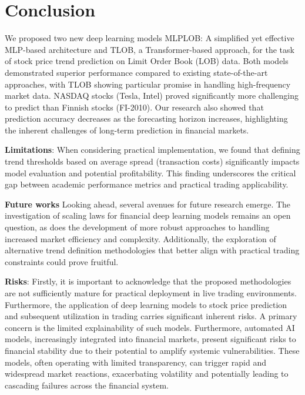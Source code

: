 \section{Conclusion}
We proposed two new deep learning models MLPLOB: A simplified yet effective MLP-based architecture and TLOB, a Transformer-based approach, for the task of stock price trend prediction on Limit Order Book (LOB) data. Both models demonstrated superior performance compared to existing state-of-the-art approaches, with TLOB showing particular promise in handling high-frequency market data. NASDAQ stocks (Tesla, Intel) proved significantly more challenging to predict than Finnish stocks (FI-2010). Our research also showed that prediction accuracy decreases as the forecasting horizon increases, highlighting the inherent challenges of long-term prediction in financial markets.
 
\textbf{Limitations}: When considering practical implementation, we found that defining trend thresholds based on average spread (transaction costs) significantly impacts model evaluation and potential profitability. This finding underscores the critical gap between academic performance metrics and practical trading applicability.

\textbf{Future works} Looking ahead, several avenues for future research emerge. The investigation of scaling laws for financial deep learning models remains an open question, as does the development of more robust approaches to handling increased market efficiency and complexity. Additionally, the exploration of alternative trend definition methodologies that better align with practical trading constraints could prove fruitful.

\textbf{Risks}: Firstly, it is important to acknowledge that the proposed methodologies are not sufficiently mature for practical deployment in live trading environments. Furthermore, the application of deep learning models to stock price prediction and subsequent utilization in trading carries significant inherent risks. A primary concern is the limited explainability of such models. 
Furthermore, automated AI models, increasingly integrated into financial markets, present significant risks to financial stability due to their potential to amplify systemic vulnerabilities. These models, often operating with limited transparency, can trigger rapid and widespread market reactions, exacerbating volatility and potentially leading to cascading failures across the financial system.